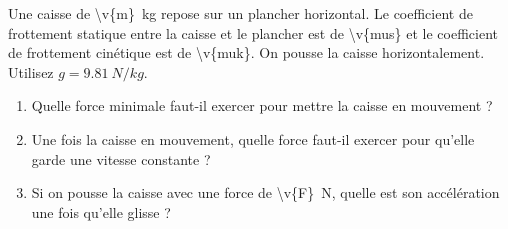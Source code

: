 Une caisse de \qty{\v{m}}{kg} repose sur un plancher horizontal. Le coefficient de frottement statique entre la caisse et le plancher est de \num{\v{mus}} et le coefficient de frottement cinétique est de \num{\v{muk}}. On pousse la caisse horizontalement. Utilisez $g = \qty{9.81}{N/kg}$.

\begin{enumerate}[label=\alph*)]
    \item Quelle force minimale faut-il exercer pour mettre la caisse en mouvement ?
    \item Une fois la caisse en mouvement, quelle force faut-il exercer pour qu'elle garde une vitesse constante ?
    \item Si on pousse la caisse avec une force de \qty{\v{F}}{N}, quelle est son accélération une fois qu'elle glisse ?
\end{enumerate}
